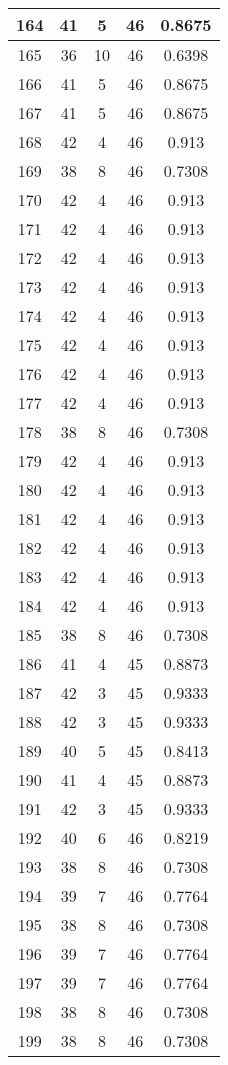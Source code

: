 \documentclass[letterpaper, 12pt]{article}
\begin{document}
\begin{longtable}{|c|c|c|c|c|}
164 & 41 & 5 & 46 & 0.8675 \\
\hline
165 & 36 & 10 & 46 & 0.6398 \\
\hline
166 & 41 & 5 & 46 & 0.8675 \\
\hline
167 & 41 & 5 & 46 & 0.8675 \\
\hline
168 & 42 & 4 & 46 & 0.913 \\
\hline
169 & 38 & 8 & 46 & 0.7308 \\
\hline
170 & 42 & 4 & 46 & 0.913 \\
\hline
171 & 42 & 4 & 46 & 0.913 \\
\hline
172 & 42 & 4 & 46 & 0.913 \\
\hline
173 & 42 & 4 & 46 & 0.913 \\
\hline
174 & 42 & 4 & 46 & 0.913 \\
\hline
175 & 42 & 4 & 46 & 0.913 \\
\hline
176 & 42 & 4 & 46 & 0.913 \\
\hline
177 & 42 & 4 & 46 & 0.913 \\
\hline
178 & 38 & 8 & 46 & 0.7308 \\
\hline
179 & 42 & 4 & 46 & 0.913 \\
\hline
180 & 42 & 4 & 46 & 0.913 \\
\hline
181 & 42 & 4 & 46 & 0.913 \\
\hline
182 & 42 & 4 & 46 & 0.913 \\
\hline
183 & 42 & 4 & 46 & 0.913 \\
\hline
184 & 42 & 4 & 46 & 0.913 \\
\hline
185 & 38 & 8 & 46 & 0.7308 \\
\hline
186 & 41 & 4 & 45 & 0.8873 \\
\hline
187 & 42 & 3 & 45 & 0.9333 \\
\hline
188 & 42 & 3 & 45 & 0.9333 \\
\hline
189 & 40 & 5 & 45 & 0.8413 \\
\hline
190 & 41 & 4 & 45 & 0.8873 \\
\hline
191 & 42 & 3 & 45 & 0.9333 \\
\hline
192 & 40 & 6 & 46 & 0.8219 \\
\hline
193 & 38 & 8 & 46 & 0.7308 \\
\hline
194 & 39 & 7 & 46 & 0.7764 \\
\hline
195 & 38 & 8 & 46 & 0.7308 \\
\hline
196 & 39 & 7 & 46 & 0.7764 \\
\hline
197 & 39 & 7 & 46 & 0.7764 \\
\hline
198 & 38 & 8 & 46 & 0.7308 \\
\hline
199 & 38 & 8 & 46 & 0.7308 \\
\hline
\end{longtable}
\end{document}
